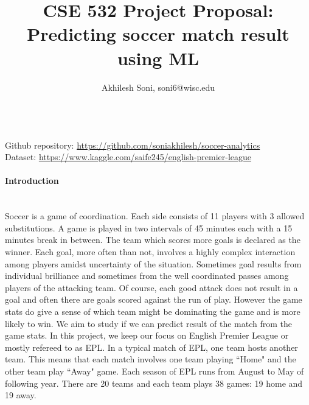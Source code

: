 \documentclass[11pt,letterpaper]{article}
\begin{document}
\title{CSE 532 Project Proposal: Predicting soccer match result using ML}
\date{}
\author{Akhilesh Soni, soni6@wisc.edu}
\maketitle
\paragraph{}\text{}\\
Github repository: \href{https://github.com/soniakhilesh/soccer-analytics}{https://github.com/soniakhilesh/soccer-analytics} \\
Dataset: \href{https://www.kaggle.com/saife245/english-premier-league}{https://www.kaggle.com/saife245/english-premier-league}
\paragraph{Introduction}\text{}\\
Soccer is a game of coordination. Each side consists of 11 players with 3 allowed substitutions. A game is played in two intervals of 45 minutes each with a 15 minutes break in between. The team which scores more goals is declared as the winner. Each goal, more often than not, involves a highly complex interaction among players amidst uncertainty of the situation. Sometimes goal results from individual brilliance and sometimes from the well coordinated passes among players of the attacking team. Of course, each good attack does not result in a goal and often there are goals scored against the run of play. However the game stats do give a sense of which team might be dominating the game and is more likely to win. We aim to study if we can predict result of the match from the game stats.
In this project, we keep our focus on English Premier League or mostly refereed to as EPL. In a typical match of EPL, one team hosts another team. This means that each match involves one team playing ``Home" and the other team play ``Away" game. Each season of EPL runs from August to  May of following year. There are 20 teams and each team plays 38 games: 19 home and 19 away. 
\end{document}
